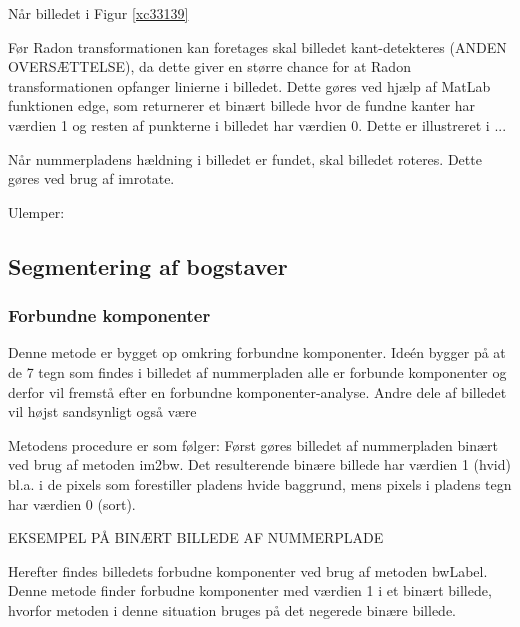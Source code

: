 
Når billedet i Figur \ref{xc33139}

Før Radon transformationen kan foretages skal billedet kant-detekteres (ANDEN OVERSÆTTELSE), da dette giver en større chance for at Radon transformationen opfanger linierne i billedet. Dette gøres ved hjælp af MatLab funktionen edge, som returnerer et binært billede hvor de fundne kanter har værdien 1 og resten af punkterne i billedet har værdien 0. Dette er illustreret i ...


Når nummerpladens hældning i billedet er fundet, skal billedet roteres. Dette gøres ved brug af imrotate. 


Ulemper:

\subsection{Segmentering af bogstaver}

\subsubsection{Forbundne komponenter}

Denne metode er bygget op omkring forbundne komponenter. Ideén bygger på at de 7 tegn som findes i billedet af nummerpladen alle er forbunde komponenter og derfor vil fremstå efter en forbundne komponenter-analyse. Andre dele af billedet vil højst sandsynligt også være 

Metodens procedure er som følger: Først gøres billedet af nummerpladen binært ved brug af metoden im2bw. Det resulterende binære billede har værdien 1 (hvid) bl.a. i de pixels som forestiller pladens hvide baggrund, mens pixels i pladens tegn har værdien 0 (sort).

EKSEMPEL PÅ BINÆRT BILLEDE AF NUMMERPLADE

Herefter findes billedets forbudne komponenter ved brug af metoden bwLabel. Denne metode finder forbudne komponenter med værdien 1 i et binært billede, hvorfor metoden i denne situation bruges på det negerede binære billede.


